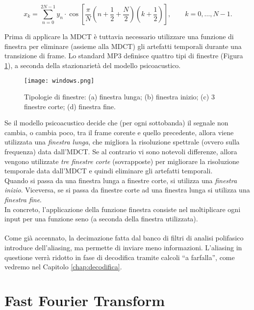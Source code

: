 			\begin{equation} \label{eqn:mdct}
				x_k = \sum_{n=0}^{2N-1}y_n\cdot\cos\left[\frac{\pi}{N}\left(n+\frac{1}{2}+\frac{N}{2}\right)\left(k+\frac{1}{2}\right)\right], \qquad k=0,\dots,N-1.
			\end{equation}
			
			Prima di applicare la MDCT è tuttavia necessario utilizzare una funzione di finestra per eliminare (assieme alla MDCT) gli artefatti temporali durante una transizione di frame. Lo standard MP3 definisce quattro tipi di finestre (Figura \ref{fig:windows}), a seconda della stazionarietà del modello psicoacustico.\\
			
			\begin{figure}[h!]
				\centering
					\texttt{[image: windows.png]}
				\caption[Tipologie di finestre.]{Tipologie di finestre: (a) finestra lunga; (b) finestra inizio; (c) 3 finestre corte; (d) finestra fine.}
				\label{fig:windows}
			\end{figure}
			
			Se il modello psicoacustico decide che (per ogni sottobanda) il segnale non cambia, o cambia poco, tra il frame corente e quello precedente, allora viene utilizzata una \textit{finestra lunga}, che migliora la risoluzione spettrale (ovvero sulla frequenza) data dall'MDCT. Se al contrario vi sono notevoli differenze, allora vengono utilizzate \textit{tre finestre corte} (sovrapposte) per migliorare la risoluzione temporale data dall'MDCT e quindi eliminare gli artefatti temporali.\\
			Quando si passa da una finestra lunga a finestre corte, si utilizza una \textit{finestra inizio}. Viceversa, se si passa da finestre corte ad una finestra lunga si utilizza una \textit{finestra fine}.\\
			In concreto, l'applicazione della funzione finestra consiste nel moltiplicare ogni input per una funzione seno (a seconda della finestra utilizzata).\\
			\\
			Come già accennato, la decimazione fatta dal banco di filtri di analisi polifasico introduce dell'aliasing, ma permette di inviare meno informazioni. L'aliasing in questione verrà ridotto in fase di decodifica tramite calcoli ``a farfalla'', come vedremo nel Capitolo \ref{chap:decodifica}.
			
	\section{Fast Fourier Transform} \label{sec:fft}
		
